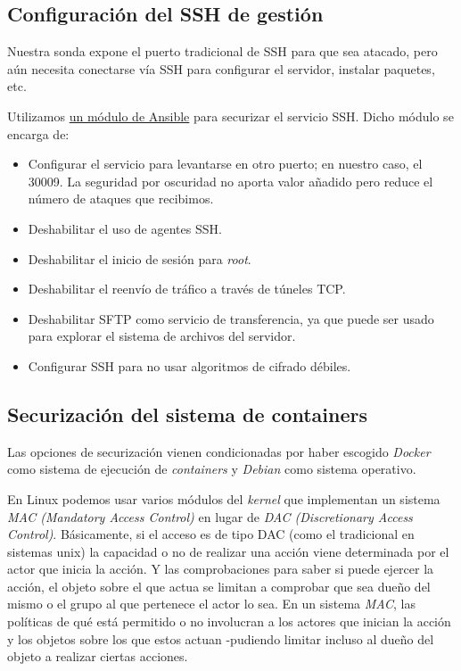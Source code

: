 \subsection{Configuración del SSH de gestión}

Nuestra sonda expone el puerto tradicional de SSH para que sea atacado, pero aún necesita conectarse vía SSH para configurar el servidor,
instalar paquetes, etc.

Utilizamos \href{https://github.com/dev-sec/ansible-ssh-hardening}{un módulo de Ansible} para securizar el servicio SSH. 
Dicho módulo se encarga de:

\begin{itemize}
    \item Configurar el servicio para levantarse en otro puerto; en nuestro caso, el 30009. 
    La seguridad por oscuridad no aporta valor añadido pero reduce el número de ataques que recibimos. 
    \item Deshabilitar el uso de agentes SSH.
    \item Deshabilitar el inicio de sesión para \emph{root}.
    \item Deshabilitar el reenvío de tráfico a través de túneles TCP.
    \item Deshabilitar SFTP como servicio de transferencia, ya que puede ser usado para explorar el sistema de archivos del servidor.
    \item Configurar SSH para no usar algoritmos de cifrado débiles. 
\end{itemize}

\subsection{Securización del sistema de containers}

Las opciones de securización vienen condicionadas por haber escogido \emph{Docker} como sistema de ejecución de \emph{containers}
y \emph{Debian} como sistema operativo. 

En Linux podemos usar varios módulos del \emph{kernel} que implementan un sistema \emph{MAC (Mandatory Access Control)} en lugar de \emph{DAC (Discretionary Access Control)}. 
Básicamente, si el acceso es de tipo DAC (como el tradicional en sistemas unix) la capacidad o no de realizar una acción viene determinada por el actor que inicia la acción. Y las comprobaciones
para saber si puede ejercer la acción, el objeto sobre el que actua se limitan a comprobar que sea dueño del mismo o el grupo al que pertenece el actor lo sea.
En un sistema \emph{MAC}, las políticas de qué está permitido o no involucran a los actores que inician la acción y los objetos sobre los que estos actuan -pudiendo limitar incluso al dueño del objeto a realizar ciertas acciones.

